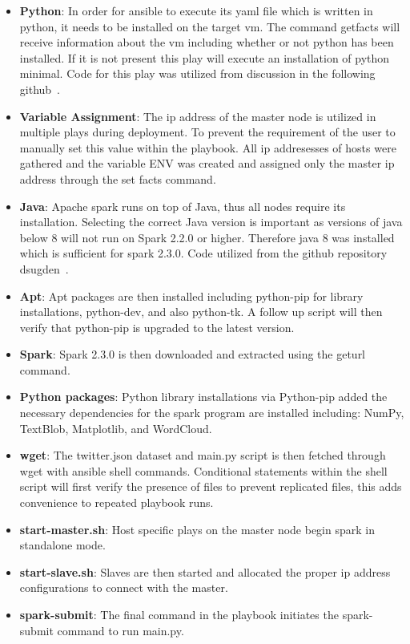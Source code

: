\begin{itemize}

\item \textbf{Python}: In order for ansible to execute its yaml file
 which is written in python, it needs to be installed on the target
 vm.  The command getfacts will receive information about the vm
 including whether or not python has been installed.  If it is not
 present this play will execute an installation of python minimal.
 Code for this play was utilized from discussion in the following
 github~\cite{www-pycheck}.

\item \textbf{Variable Assignment}: The ip address of the master node
 is utilized in multiple plays during deployment. To prevent the
 requirement of the user to manually set this value within the
 playbook. All ip addresesses of hosts were gathered and the variable
 ENV was created and assigned only the master ip address through the
 set facts command.
 
\item \textbf{Java}: Apache spark runs on top of Java, thus all nodes
 require its installation.  Selecting the correct Java version is
 important as versions of java below 8 will not run on Spark 2.2.0 or
 higher.  Therefore java 8 was installed which is sufficient for spark
 2.3.0.  Code utilized from the github repository dsugden~\cite{www-java8}.

\item \textbf{Apt}: Apt packages are then installed including
python-pip for library installations, python-dev, and also python-tk.
A follow up script will then verify that python-pip is upgraded to the
latest version.

\item \textbf{Spark}: Spark 2.3.0 is then downloaded and extracted
using the geturl command.

\item \textbf{Python packages}: Python library installations via
Python-pip added the necessary dependencies for the spark program are
installed including: NumPy, TextBlob, Matplotlib, and WordCloud.

\item \textbf{wget}: The twitter.json dataset and
main.py script is then fetched through wget with ansible shell
commands.  Conditional statements within the shell script will first
verify the presence of files to prevent replicated files, this adds
convenience to repeated playbook runs.

\item \textbf{start-master.sh}: Host specific plays on the master
node begin spark in standalone mode.

\item \textbf{start-slave.sh}: Slaves are then started and allocated the
 proper ip address configurations to connect with the master.

\item \textbf{spark-submit}: The final command in the playbook
 initiates the spark-submit command to run main.py.

\end{itemize}



